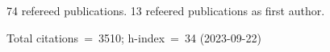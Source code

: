 74 refereed publications. 13 refeered publications as first author.

Total citations~=~3510; h-index~=~34 (2023-09-22)